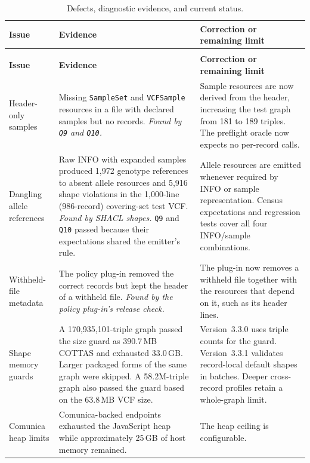 \documentclass[11pt]{article}
\begin{document}
\begin{longtable}{@{}>{\raggedright\arraybackslash}p{}>{\raggedright\arraybackslash}p{}>{\raggedright\arraybackslash}p{}@{}}
\caption{Defects, diagnostic evidence, and current status.}\label{tab:issues}\\
\toprule
\textbf{Issue} & \textbf{Evidence} & \textbf{Correction or remaining limit}\\
\midrule
\endfirsthead
\multicolumn{3}{@{}l}{\scriptsize\textit{Table~\ref{tab:issues}, continued}}\\
\toprule
\textbf{Issue} & \textbf{Evidence} & \textbf{Correction or remaining limit}\\
\midrule
\endhead
\bottomrule
\endlastfoot
Header-only samples & Missing \texttt{SampleSet} and \texttt{VCFSample} resources in a file with declared samples but no records.
\textit{Found by \texttt{Q9} and \texttt{Q10}.} & Sample resources are now derived from the header, increasing the test graph from 181 to 189 triples.
The preflight oracle now expects no per-record calls.\\
\addlinespace
Dangling allele references & Raw INFO with expanded samples produced 1,972 genotype references to absent allele resources and 5,916 shape violations in the 1,000-line (986-record) covering-set test VCF.
\textit{Found by SHACL shapes.}
\texttt{Q9} and \texttt{Q10} passed because their expectations shared the emitter's rule. & Allele resources are emitted whenever required by INFO or sample representation.
Census expectations and regression tests cover all four INFO/sample combinations.\\
\addlinespace
Withheld-file metadata & The policy plug-in removed the correct records but kept the header of a withheld file.
\textit{Found by the policy plug-in's release check.} & The plug-in now removes a withheld file together with the resources that depend on it, such as its header lines.\\
\addlinespace
Shape memory guards & A 170,935,101-triple graph passed the size guard as 390.7\,MB COTTAS and exhausted 33.0\,GB.
Larger packaged forms of the same graph were skipped.
A 58.2M-triple graph also passed the guard based on the 63.8\,MB VCF size. & Version~3.3.0 uses triple counts for the guard.
Version~3.3.1 validates record-local default shapes in batches.
Deeper cross-record profiles retain a whole-graph limit.\\
\addlinespace
Comunica heap limits & Comunica-backed endpoints exhausted the JavaScript heap while approximately 25\,GB of host memory remained. & The heap ceiling is configurable.

\end{longtable}
\end{document}
